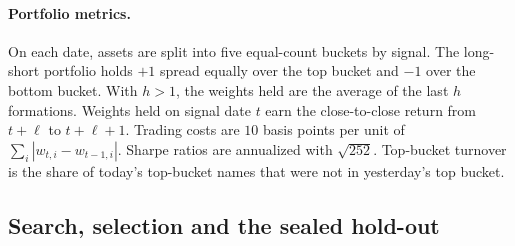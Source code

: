 \paragraph{Portfolio metrics.} On each date, assets are split into five
equal-count buckets by signal. The long-short portfolio holds $+1$ spread
equally over the top bucket and $-1$ over the bottom bucket. With $h>1$, the
weights held are the average of the last $h$ formations. Weights held on
signal date $t$ earn the close-to-close return from $t+\ell$ to $t+\ell+1$.
Trading costs are $10$ basis points per unit of $\sum_i|w_{t,i}-w_{t-1,i}|$.
Sharpe ratios are annualized with $\sqrt{252}$. Top-bucket turnover is the
share of today's top-bucket names that were not in yesterday's top bucket.

\subsection{Search, selection and the sealed hold-out}
\label{sec:protocol}

